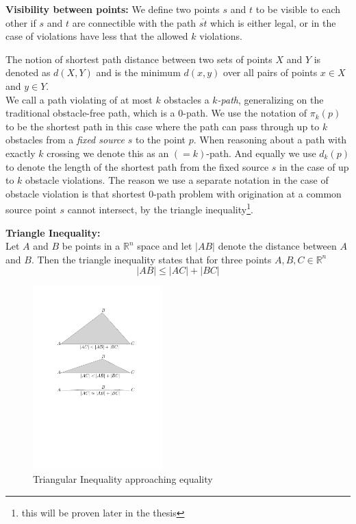 \begin{mydef}
	\textbf{Visibility between points:}
    We define two points $s$ and $t$ to be visible to each other if $s$ and $t$ are 
    connectible with the path $\overline{st}$ which is either legal, or in the case 
    of violations have less that the allowed $k$ violations.
\end{mydef}

The notion of shortest path distance between two sets of points $X$ and $Y$ is 
denoted as $d(X,Y)$ and is the minimum $d(x,y)$ over all pairs of points $x\in X$ 
and $y \in Y$. \cite{HershbergerS99} \\

We call a path violating of at most $k$ obstacles a \textit{$k$-path}, generalizing 
on the traditional obstacle-free path, which is a 0-path. We use the notation of 
$\pi_k(p)$ to be the shortest path in this case where the path can pass through up 
to $k$ obstacles from a \textit{fixed source} $s$ to the point $p$. When reasoning 
about a path with exactly $k$ crossing we denote this as an $(=k)$-path. And 
equally we use $d_k(p)$ to denote the length of the shortest path from the fixed 
source $s$ in the case of up to $k$ obstacle violations. The reason we use a 
separate notation in the case of obstacle violation is that shortest 0-path 
problem with origination at a common source point $s$ cannot intersect, by the 
triangle inequality\cite{HershbergerKS17}\footnote{this will be proven later in 
the thesis}.

\begin{mydef}
	\textbf{Triangle Inequality:} \\ 
	Let $A$ and $B$ be points in a $\mathbb{R}^n$ space and let $|AB|$ denote
	the distance between $A$ and $B$.  Then the triangle inequality states that
	for three points $A,B,C\in\mathbb{R}^n$ \cite{metricspaceandpoints}
	$$|AB|\leq|AC|+|BC|$$
\end{mydef} 
\begin{figure}[H] 
	\centering
	\includegraphics[width=5cm]{figures/TriangularInequality.pdf}
	\caption{Triangular Inequality approaching equality}
	\label{fig:TriangularInequality} 
\end{figure}


